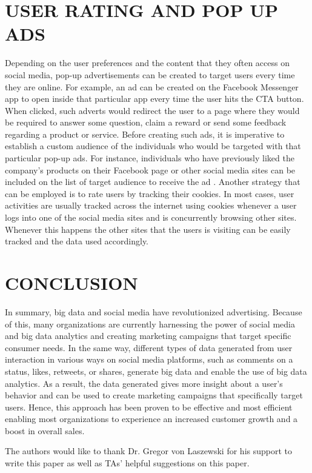 \documentclass[sigconf]{acmart}
\begin{document}
\section{USER RATING AND POP UP ADS}
Depending on the user preferences and the content that they often access on social media, pop-up advertisements can be created to target users every time they are online. For example, an ad can be created on the Facebook Messenger app to open inside that particular app every time the user hits the CTA button. When clicked, such adverts would redirect the user to a page where they would be required to answer some question, claim a reward or send some feedback regarding a product or service. Before creating such ads, it is imperative to establish a custom audience of the individuals who would be targeted with that particular pop-up ads. For instance, individuals who have previously liked the company’s products on their Facebook page or other social media sites can be included on the list of target audience to receive the ad \cite{Aycock2010}. Another strategy that can be employed is to rate users by tracking their cookies. In most cases, user activities are usually tracked across the internet using cookies whenever a user logs into one of the social media sites and is concurrently browsing other sites. Whenever this happens the other sites that the users is visiting can be easily tracked and the data used accordingly.

\section{CONCLUSION}
In summary, big data and social media have revolutionized advertising. Because of this, many organizations are currently harnessing the power of social media and big data analytics and creating marketing campaigns that target specific consumer needs. In the same way, different types of data generated from user interaction in various ways on social media platforms, such as comments on a status, likes, retweets, or shares, generate big data and enable the use of big data analytics. As a result, the data generated gives more insight about a user’s behavior and can be used to create marketing campaigns that specifically target users. Hence, this approach has been proven to be effective and most efficient enabling most organizations to experience an increased customer growth and a boost in overall sales.

\begin{acks}

  The authors would like to thank Dr. Gregor von Laszewski for his support to write this paper as well as TAs' helpful suggestions on this paper. 

\end{acks}


 
\end{document}
